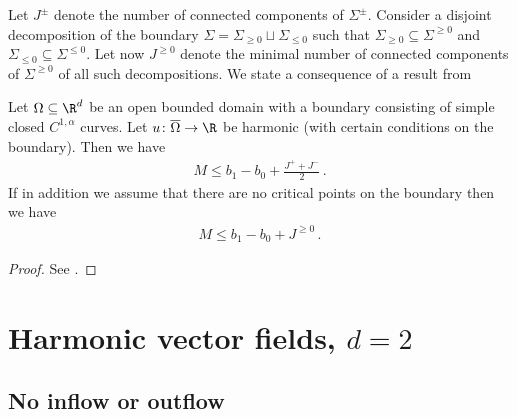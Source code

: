Let $J^\pm$ denote the number of connected components of $\Sigma^\pm$.
Consider a disjoint decomposition of the boundary $\Sigma=\Sigma_{\geq0}\sqcup\Sigma_{\leq0}$ such
that $\Sigma_{\geq0}\subseteq\Sigma^{\geq0}$ and $\Sigma_{\leq0}\subseteq\Sigma^{\leq0}$.
Let now $J^{\geq0}$ denote the minimal number of connected components of $\Sigma^{\geq0}$ of all such
decompositions.
We state a consequence of a result from \cite[Theorem 2.1]{Alessandrini1992}
\begin{proposition} 
  Let $\Omega\subseteq\R^d$ be an open bounded domain with a boundary consisting of simple closed $C^{1,\alpha}$ curves.
  Let $u\colon \overline{\Omega}\to \R$ be harmonic (with certain conditions on the boundary).
  Then we have
  \begin{align*}
    M\leq b_1-b_0+\frac{J^++J^-}{2}\,.
  \end{align*}
  If in addition we assume that there are no critical points on the boundary then we have
  \begin{align*}
    M\leq b_1-b_0+J^{\geq0}\,.
  \end{align*}
\end{proposition}
\begin{proof}
  See \cite[Theorem 2.1]{Alessandrini1992}.
\end{proof}

\newpage

\section{Harmonic vector fields, $d=2$}


\subsection{No inflow or outflow}

